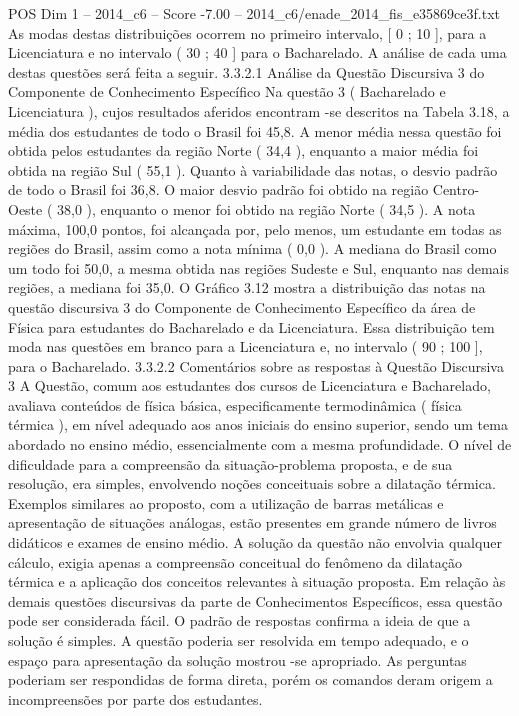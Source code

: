 \begin{textsample}{POS Dim 1 – 2014\_c6 – Score -7.00 – 2014\_c6/enade\_2014\_fis\_e35869ce3f.txt}
As modas destas distribuições ocorrem no primeiro intervalo, [ 0 ; 10 ], para a Licenciatura e no intervalo ( 30 ; 40 ] para o Bacharelado.
A análise de cada uma destas questões será feita a seguir. 3.3.2.1 Análise da Questão Discursiva 3 do Componente de Conhecimento Específico Na questão 3 ( Bacharelado e Licenciatura ), cujos resultados aferidos encontram -se descritos na Tabela 3.18, a média dos estudantes de todo o Brasil foi 45,8.
A menor média nessa questão foi obtida pelos estudantes da região Norte ( 34,4 ), enquanto a maior média foi obtida na região Sul ( 55,1 ).
Quanto à variabilidade das notas, o desvio padrão de todo o Brasil foi 36,8.
O maior desvio padrão foi obtido na região Centro-Oeste ( 38,0 ), enquanto o menor foi obtido na região Norte ( 34,5 ).
A nota máxima, 100,0 pontos, foi alcançada por, pelo menos, um estudante em todas as regiões do Brasil, assim como a nota mínima ( 0,0 ).
A mediana do Brasil como um todo foi 50,0, a mesma obtida nas regiões Sudeste e Sul, enquanto nas demais regiões, a mediana foi 35,0.
O Gráfico 3.12 mostra a distribuição das notas na questão discursiva 3 do Componente de Conhecimento Específico da área de Física para estudantes do Bacharelado e da Licenciatura.
Essa distribuição tem moda nas questões em branco para a Licenciatura e, no intervalo ( 90 ; 100 ], para o Bacharelado. 3.3.2.2 Comentários sobre as respostas à Questão Discursiva 3 A Questão, comum aos estudantes dos cursos de Licenciatura e Bacharelado, avaliava conteúdos de física básica, especificamente termodinâmica ( física térmica ), em nível adequado aos anos iniciais do ensino superior, sendo um tema abordado no ensino médio, essencialmente com a mesma profundidade.
O nível de dificuldade para a compreensão da situação-problema proposta, e de sua resolução, era simples, envolvendo noções conceituais sobre a dilatação térmica.
Exemplos similares ao proposto, com a utilização de barras metálicas e apresentação de situações análogas, estão presentes em grande número de livros didáticos e exames de ensino médio.
A solução da questão não envolvia qualquer cálculo, exigia apenas a compreensão conceitual do fenômeno da dilatação térmica e a aplicação dos conceitos relevantes à situação proposta.
Em relação às demais questões discursivas da parte de Conhecimentos Específicos, essa questão pode ser considerada fácil.
O padrão de respostas confirma a ideia de que a solução é simples.
A questão poderia ser resolvida em tempo adequado, e o espaço para apresentação da solução mostrou -se apropriado.
As perguntas poderiam ser respondidas de forma direta, porém os comandos deram origem a incompreensões por parte dos estudantes.

\end{textsample}

